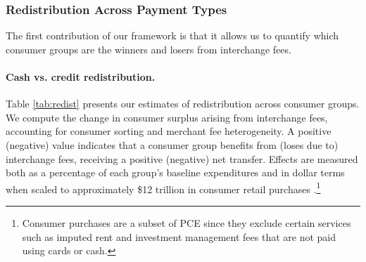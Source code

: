 \documentclass[main.tex]{subfiles}
\begin{document}




\subsubsection{Redistribution Across Payment Types}

The first contribution of our framework is that it allows us to quantify which consumer groups are the winners and losers from interchange fees.

\paragraph{Cash vs. credit redistribution.}

Table \ref{tab:redist} presents our estimates of redistribution across consumer groups.
We compute the change in consumer surplus arising from interchange fees, accounting for consumer sorting and merchant fee heterogeneity. 
A positive (negative) value indicates that a consumer group benefits from (loses due to) interchange fees, receiving a positive (negative) net transfer.
Effects are measured both as a percentage of each group's baseline expenditures and in dollar terms when scaled to approximately \$12 trillion in consumer retail purchases \citep{Nilson2023a}.\footnote{Consumer purchases are a subset of PCE since they exclude certain services such as imputed rent and investment management fees that are not paid using cards or cash.}
\end{document}
